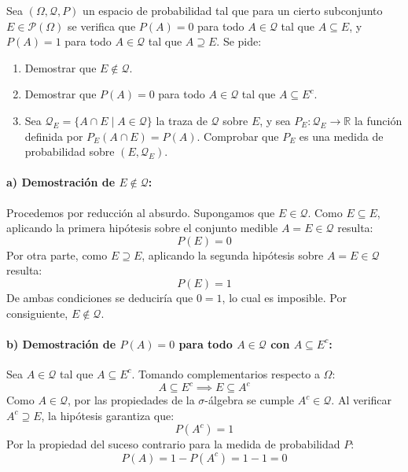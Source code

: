\newpage

\begin{problema}
Sea $(\Omega, \mathcal{Q}, P)$ un espacio de probabilidad tal que para un cierto subconjunto $E \in \mathcal{P}(\Omega)$ se verifica que $P(A) = 0$ para todo $A \in \mathcal{Q}$ tal que $A \subseteq E$, y $P(A) = 1$ para todo $A \in \mathcal{Q}$ tal que $A \supseteq E$. Se pide:
\begin{enumerate}[label=\alph*)]
    \item Demostrar que $E \notin \mathcal{Q}$.
    \item Demostrar que $P(A) = 0$ para todo $A \in \mathcal{Q}$ tal que $A \subseteq E^c$.
    \item Sea $\mathcal{Q}_E = \{ A \cap E \mid A \in \mathcal{Q} \}$ la traza de $\mathcal{Q}$ sobre $E$, y sea $P_E : \mathcal{Q}_E \to \mathbb{R}$ la función definida por $P_E(A \cap E) = P(A)$. Comprobar que $P_E$ es una medida de probabilidad sobre $(E, \mathcal{Q}_E)$.
\end{enumerate}

\tcblower

\paragraph{a) Demostración de $E \notin \mathcal{Q}$:}
Procedemos por reducción al absurdo. Supongamos que $E \in \mathcal{Q}$.
Como $E \subseteq E$, aplicando la primera hipótesis sobre el conjunto medible $A = E \in \mathcal{Q}$ resulta:
\[
    P(E) = 0
\]
Por otra parte, como $E \supseteq E$, aplicando la segunda hipótesis sobre $A = E \in \mathcal{Q}$ resulta:
\[
    P(E) = 1
\]
De ambas condiciones se deduciría que $0 = 1$, lo cual es imposible. Por consiguiente, $E \notin \mathcal{Q}$.

\paragraph{b) Demostración de $P(A) = 0$ para todo $A \in \mathcal{Q}$ con $A \subseteq E^c$:}
Sea $A \in \mathcal{Q}$ tal que $A \subseteq E^c$. Tomando complementarios respecto a $\Omega$:
\[
    A \subseteq E^c \implies E \subseteq A^c
\]
Como $A \in \mathcal{Q}$, por las propiedades de la $\sigma$-álgebra se cumple $A^c \in \mathcal{Q}$. Al verificar $A^c \supseteq E$, la hipótesis garantiza que:
\[
    P(A^c) = 1
\]
Por la propiedad del suceso contrario para la medida de probabilidad $P$:
\[
    P(A) = 1 - P(A^c) = 1 - 1 = 0
\]


\end{problema}
